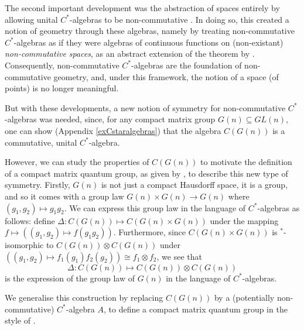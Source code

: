 \documentclass{article}
\theoremstyle{plain}
\theoremstyle{definition}
\theoremstyle{remark}
\begin{document}

The second important development was the abstraction of spaces 
entirely by allowing unital $C^{*}$-algebras to be non-commutative 
\citep{Jimbo1985, drinfeld1986, woronowicz1987}.
In doing so, this created a notion of geometry through these algebras, namely by
treating non-commutative $C^{*}$-algebras
as if they were algebras of continuous functions 
on (non-existant) \textit{non-commutative spaces},
as an abstract extension of the theorem by \citet{gelfand1943}.
Consequently, non-commutative $C^{*}$-algebras are
the foundation of non-commutative geometry,
and, under this framework, the notion of a space (of points) is no longer meaningful. 

But with these developments, a new notion of symmetry for non-commutative 
$C^{*}$-algebras was needed, since, for any 
compact matrix group $G(n) \subseteq GL(n)$, 
one can show 
(Appendix \ref{exCstaralgebras}) 
that the algebra $C(G(n))$ 
is a commutative, unital $C^{*}$-algebra.

However, we can study the properties of $C(G(n))$ 
to motivate the definition of a compact matrix quantum group, as given by
\citet{woronowicz1987},
to describe this new type of symmetry.
Firstly, $G(n)$ is 
not just
a compact Hausdorff space, it is a group,
and so it comes with a group law $G(n) \times G(n) \rightarrow G(n)$
where $(g_1, g_2) \mapsto g_1g_2$.
We can express this group law in the language of $C^{*}$-algebras as follows:
define
$\Delta: C(G(n)) \mapsto C(G(n) \times G(n))$ 
under the mapping
$f \mapsto ((g_1, g_2) \mapsto f(g_1g_2))$.
Furthermore, since $C(G(n) \times G(n))$ is $^*$-isomorphic to $C(G(n)) \otimes C(G(n))$
under $((g_1, g_2) \mapsto f_1(g_1)f_2(g_2)) \cong f_1 \otimes f_2$,
we see that 
\begin{equation}
	\Delta: C(G(n)) \mapsto C(G(n)) \otimes C(G(n))
\end{equation}
is the expression of the group law of $G(n)$ in the language of $C^{*}$-algebras.

We generalise this construction by replacing $C(G(n))$ by a 
(potentially non-commutative) $C^{*}$-algebra $A$, to define a
compact matrix quantum group in the style of \citet{woronowicz1987}.
\end{document}
